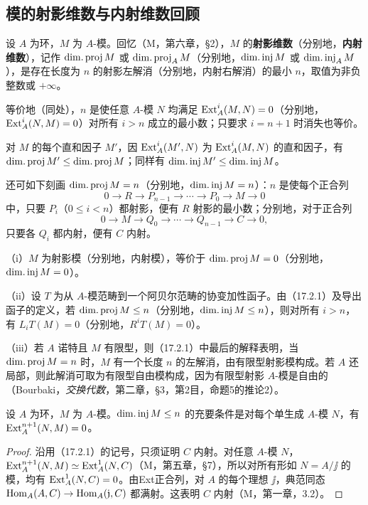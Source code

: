 \subsection{模的射影维数与内射维数回顾}

设 $A$ 为环，$M$ 为 $A$-模。回忆（M，第六章，§2），$M$ 的\textbf{射影维数}（分别地，\textbf{内射维数}），记作 $\operatorname{dim.proj} M$ 或 $\operatorname{dim.proj}_A M$（分别地，$\operatorname{dim.inj} M$ 或 $\operatorname{dim.inj}_A M$），是存在长度为 $n$ 的射影左解消（分别地，内射右解消）的最小 $n$，取值为非负整数或 $+\infty$。

等价地（同处），$n$ 是使任意 $A$-模 $N$ 均满足
$\operatorname{Ext}_A^i(M,N)=0$（分别地，$\operatorname{Ext}_A^i(N,M)=0$）对所有 $i>n$ 成立的最小数；只要求 $i=n+1$ 时消失也等价。

对 $M$ 的每个直和因子 $M'$，因 $\operatorname{Ext}_A^i(M',N)$ 为 $\operatorname{Ext}_A^i(M,N)$ 的直和因子，有
$\operatorname{dim.proj} M'\leq\operatorname{dim.proj} M$；同样有 $\operatorname{dim.inj} M'\leq\operatorname{dim.inj} M$。

还可如下刻画 $\operatorname{dim.proj} M=n$（分别地，$\operatorname{dim.inj} M=n$）：$n$ 是使每个正合列
\[
 0\longrightarrow R\longrightarrow P_{n-1}\longrightarrow\cdots
 \longrightarrow P_0\longrightarrow M\longrightarrow0
\]
中，只要 $P_i$（$0\leq i<n$）都射影，便有 $R$ 射影的最小数；分别地，对于正合列
\[
 0\longrightarrow M\longrightarrow Q_0\longrightarrow\cdots
 \longrightarrow Q_{n-1}\longrightarrow C\longrightarrow0,
\]
只要各 $Q_i$ 都内射，便有 $C$ 内射。

（i）$M$ 为射影模（分别地，内射模），等价于 $\operatorname{dim.proj} M=0$（分别地，$\operatorname{dim.inj} M=0$）。

（ii）设 $T$ 为从 $A$-模范畴到一个阿贝尔范畴的协变加性函子。由（17.2.1）及导出函子的定义，若 $\operatorname{dim.proj} M\leq n$（分别地，$\operatorname{dim.inj} M\leq n$），则对所有 $i>n$，有 $L_iT(M)=0$（分别地，$R^iT(M)=0$）。

（iii）若 $A$ 诺特且 $M$ 有限型，则（17.2.1）中最后的解释表明，当 $\operatorname{dim.proj} M=n$ 时，$M$ 有一个长度 $n$ 的左解消，由有限型射影模构成。若 $A$ 还局部，则此解消可取为有限型自由模构成，因为有限型射影 $A$-模是自由的（Bourbaki，\textit{交换代数}，第二章，§3，第2目，命题5的推论2）。

设 $A$ 为环，$M$ 为 $A$-模。$\operatorname{dim.inj} M\leq n$ 的充要条件是对每个单生成 $A$-模 $N$，有 $\operatorname{Ext}_A^{n+1}(N,M)=0$。
\begin{proof}
沿用（17.2.1）的记号，只须证明 $C$ 内射。对任意 $A$-模 $N$，$\operatorname{Ext}_A^{n+1}(N,M)\simeq\operatorname{Ext}_A^1(N,C)$（M，第五章，§7），所以对所有形如 $N=A/\jj$ 的模，均有 $\operatorname{Ext}_A^1(N,C)=0$。由Ext正合列，对 $A$ 的每个理想 $\jj$，典范同态
$\operatorname{Hom}_A(A,C)\to\operatorname{Hom}_A(\mathfrak j,C)$ 都满射。这表明 $C$ 内射（M，第一章，3.2）。
\end{proof}

